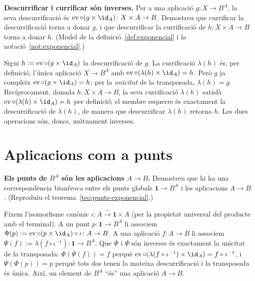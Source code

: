 \begin{exercici}
\textbf{Descurrificar i currificar són inverses.} Per a una aplicació \(g\colon X\to B^A\), la seva descurrificació és \(\operatorname{ev}\circ(g\times\id_A)\colon X\times A\to B\). Demostreu que currificar la descurrificació torna a donar \(g\), i que descurrificar la currificació de \(h\colon X\times A\to B\) torna a donar \(h\). (Model de la definició~\ref{def:exponencial} i la notació~\ref{not:exponencial}.)
\end{exercici}
\begin{solucio}
Sigui \(h:=\operatorname{ev}\circ(g\times\id_A)\) la descurrificació de \(g\). La currificació \(\lambda(h)\) és, per definició, l'única aplicació \(X\to B^A\) amb \(\operatorname{ev}\circ(\lambda(h)\times\id_A)=h\). Però \(g\) ja compleix \(\operatorname{ev}\circ(g\times\id_A)=h\); per la \emph{unicitat} de la transposada, \(\lambda(h)=g\). Recíprocament, donada \(h\colon X\times A\to B\), la seva currificació \(\lambda(h)\) satisfà \(\operatorname{ev}\circ(\lambda(h)\times\id_A)=h\) per definició; el membre esquerre és exactament la descurrificació de \(\lambda(h)\), de manera que descurrificar \(\lambda(h)\) retorna \(h\). Les dues operacions són, doncs, mútuament inverses.
\end{solucio}

\section{Aplicacions com a punts}\label{prac:exp-punts}

\begin{exercici}
\textbf{Els punts de \(B^A\) són les aplicacions \(A\to B\).} Demostreu que hi ha una correspondència biunívoca entre els punts globals \(\mathbf1\to B^A\) i les aplicacions \(A\to B\). (Reproduïu el teorema~\ref{teo:punts-exponencial}.)
\end{exercici}
\begin{solucio}
Fixem l'isomorfisme canònic \(\iota\colon A\xrightarrow{\sim}\mathbf1\times A\) (per la propietat universal del producte amb el terminal). A un punt \(p\colon\mathbf1\to B^A\) li associem \(\Phi(p):=\operatorname{ev}\circ(p\times\id_A)\circ\iota\colon A\to B\). A una aplicació \(f\colon A\to B\) li associem \(\Psi(f):=\lambda(f\circ\iota^{-1})\colon\mathbf1\to B^A\). Que \(\Phi\) i \(\Psi\) són inverses és exactament la unicitat de la transposada: \(\Phi(\Psi(f))=f\) perquè \(\operatorname{ev}\circ(\lambda(f\circ\iota^{-1})\times\id_A)=f\circ\iota^{-1}\), i \(\Psi(\Phi(p))=p\) perquè tots dos tenen la mateixa descurrificació i la transposada és única. Així, un element de \(B^A\) \enquote{és} una aplicació \(A\to B\).
\end{solucio}

